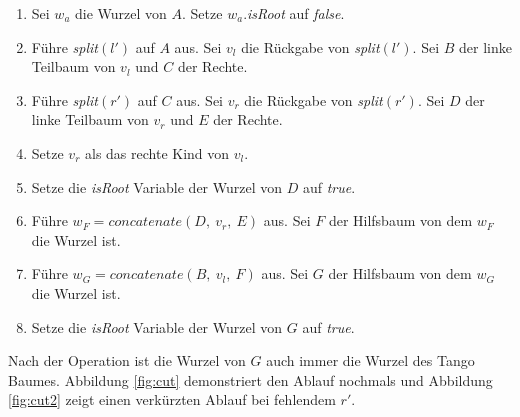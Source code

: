 \documentclass[a4paper,12pt]{article}
\begin{document}
\begin{enumerate}
	\item Sei $w_a$ die Wurzel von $A$. Setze $w_a$.\textit{isRoot} auf \textit{false}. 
	\item Führe \textit{split}$\left(l'\right)$ auf $A$ aus. Sei $v_l$ die Rückgabe von \textit{split}$\left(l'\right)$. Sei $B$ der linke Teilbaum von $v_l$ und $C$ der Rechte. 
	\item Führe \textit{split}$\left(r'\right)$ auf $C$ aus. Sei $v_r$ die Rückgabe von \textit{split}$\left(r'\right)$. Sei $D$ der linke Teilbaum von $v_r$ und $E$ der Rechte. 
	\item Setze $v_r$ als das rechte Kind von $v_l$. 
	\item Setze die \textit{isRoot} Variable der Wurzel von $D$ auf \textit{true}.
	\item Führe $w_F = \textit{concatenate}\left(D, ~ v_r, ~ E \right)$ aus. Sei $F$ der Hilfsbaum von dem $w_F$ die Wurzel ist.
	\item Führe $w_G = \textit{concatenate}\left(B, ~ v_l,~ F \right)$ aus. Sei $G$ der Hilfsbaum von dem  $w_G$ die Wurzel ist.
	\item Setze die \textit{isRoot} Variable der Wurzel von $G$ auf \textit{true}.
\end{enumerate}
Nach der Operation ist die Wurzel von $G$ auch immer die Wurzel des Tango Baumes. Abbildung \ref{fig:cut} demonstriert den Ablauf nochmals und Abbildung \ref{fig:cut2} zeigt einen verkürzten Ablauf bei fehlendem $r'$.
\end{document}

